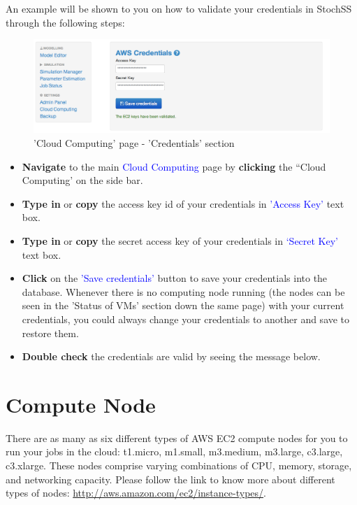 An example will be shown to you on how to validate your credentials in StochSS through the following steps:

\begin{figure}[!ht]
\centering
\includegraphics[scale=0.45]{T6/T6_fig_credentials.png}
\caption{'Cloud Computing' page - 'Credentials' section}
\label{fig:2}
\end{figure}

\begin{itemize}
\item \textbf{Navigate} to the main \textcolor{blue}{Cloud Computing} page by \textbf{clicking} the ``Cloud Computing' on the side bar.
\item \textbf{Type in} or \textbf{copy} the access key id of your credentials in \textcolor{blue}{'Access Key'} text box.
 \item \textbf{Type in} or \textbf{copy} the secret access key of your credentials in \textcolor{blue}{`Secret Key'} text box. 
 \item \textbf{Click} on the \textcolor{blue}{'Save credentials'} button to save your credentials into the database. Whenever there is no computing node running (the nodes can be seen in the 'Status of VMs' section down the same page) with your current credentials, you could always change your credentials to another and save to restore them.
 \item \textbf{Double check} the credentials are valid by seeing the message below.

\end{itemize}

\newpage

\section{Compute Node}
There are as many as six different types of AWS EC2 compute nodes for you to run your jobs in the cloud: t1.micro, m1.small, m3.medium, m3.large, c3.large, c3.xlarge. These nodes comprise varying combinations of CPU, memory, storage, and networking capacity. Please follow the link to know more about different types of nodes: \url{http://aws.amazon.com/ec2/instance-types/}.

